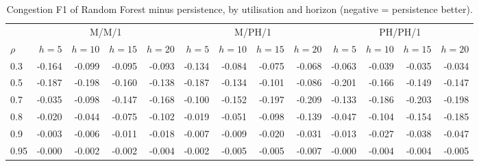 \begin{table}[htbp]
\centering
\footnotesize
\setlength{\tabcolsep}{3.5pt}
\caption{Congestion F1 of Random Forest minus persistence, by utilisation and horizon (negative = persistence better).}
\label{tab:consolidated_f1}
\begin{tabular}{lrrrrrrrrrrrr}
\toprule
 & \multicolumn{4}{c}{M/M/1} & \multicolumn{4}{c}{M/PH/1} & \multicolumn{4}{c}{PH/PH/1} \\
\cmidrule(lr){2-5}\cmidrule(lr){6-9}\cmidrule(lr){10-13}
$\rho$ & $h=5$ & $h=10$ & $h=15$ & $h=20$ & $h=5$ & $h=10$ & $h=15$ & $h=20$ & $h=5$ & $h=10$ & $h=15$ & $h=20$ \\
\midrule
0.3 & -0.164 & -0.099 & -0.095 & -0.093 & -0.134 & -0.084 & -0.075 & -0.068 & -0.063 & -0.039 & -0.035 & -0.034 \\
0.5 & -0.187 & -0.198 & -0.160 & -0.138 & -0.187 & -0.134 & -0.101 & -0.086 & -0.201 & -0.166 & -0.149 & -0.147 \\
0.7 & -0.035 & -0.098 & -0.147 & -0.168 & -0.100 & -0.152 & -0.197 & -0.209 & -0.133 & -0.186 & -0.203 & -0.198 \\
0.8 & -0.020 & -0.044 & -0.075 & -0.102 & -0.019 & -0.051 & -0.098 & -0.139 & -0.047 & -0.104 & -0.154 & -0.185 \\
0.9 & -0.003 & -0.006 & -0.011 & -0.018 & -0.007 & -0.009 & -0.020 & -0.031 & -0.013 & -0.027 & -0.038 & -0.047 \\
0.95 & -0.000 & -0.002 & -0.002 & -0.004 & -0.002 & -0.005 & -0.005 & -0.007 & -0.000 & -0.004 & -0.004 & -0.005 \\
\bottomrule
\end{tabular}
\end{table}

